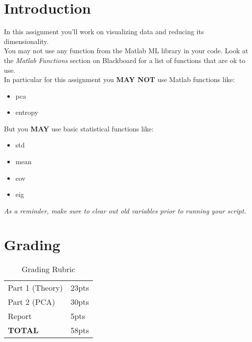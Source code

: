 \documentclass[12pt]{article}
\begin{document}
\maketitle


\section*{Introduction}
In this assignment you'll work on visualizing data and reducing its dimensionality.\\

\noindent
You may not use any function from the Matlab ML library in your code.  Look at the \emph{Matlab Functions} section on Blackboard for a list of functions that are ok to use.\\

\noindent
In particular for this assignment you \textbf{MAY NOT} use Matlab functions like:
\begin{itemize}
\item pca
\item entropy
\end{itemize}

\noindent
But you \textbf{MAY} use basic statistical functions like:
\begin{itemize}
\item std
\item mean
\item cov
\item eig
\end{itemize}

\begin{center}
\emph{As a reminder, make sure to clear out old variables prior to running your script}.
\end{center}


\section*{Grading}
\begin{table}[h]
\begin{centering}
\begin{tabular}{|l|l|}
\hline
Part 1 (Theory) & 23pts \\
Part 2 (PCA) & 30pts\\
Report & 5pts\\
\hline
\textbf{TOTAL} & 58pts\\
\hline
\end{tabular}
\caption{Grading Rubric}
\end{centering}
\end{table}
\end{document}
